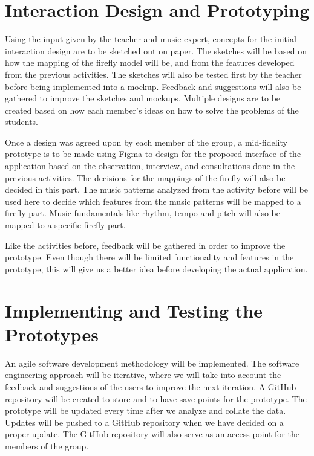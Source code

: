 \section{Interaction Design and Prototyping}
Using the input given by the teacher and music expert, concepts for the initial interaction design are to be sketched out on paper. The sketches will be based on how the mapping of the firefly model will be, and from the features developed from the previous activities. The sketches will also be tested first by the teacher before being implemented into a mockup. Feedback and suggestions will also be gathered to improve the sketches and mockups. Multiple designs are to be created based on how each member's ideas on how to solve the problems of the students. 

Once a design was agreed upon by each member of the group, a mid-fidelity prototype is to be made using Figma to design for the proposed interface of the application based on the observation, interview, and consultations done in the previous activities. The decisions for the mappings of the firefly will also be decided in this part. The music patterns analyzed from the activity before will be used here to decide which features from the music patterns will be mapped to a firefly part. Music fundamentals like rhythm, tempo and pitch will also be mapped to a specific firefly part.

Like the activities before, feedback will be gathered in order to improve the prototype. Even though there will be limited functionality and features in the prototype, this will give us a better idea before developing the actual application.

\section{Implementing and Testing the Prototypes}
An agile software development methodology will be implemented. The software engineering approach will be iterative, where we will take into account the feedback and suggestions of the users to improve the next iteration. A GitHub repository will be created to store and to have save points for the prototype. The prototype will be updated every time after we analyze and collate the data. Updates will be pushed to a GitHub repository when we have decided on a proper update. The GitHub repository will also serve as an access point for the members of the group. 


